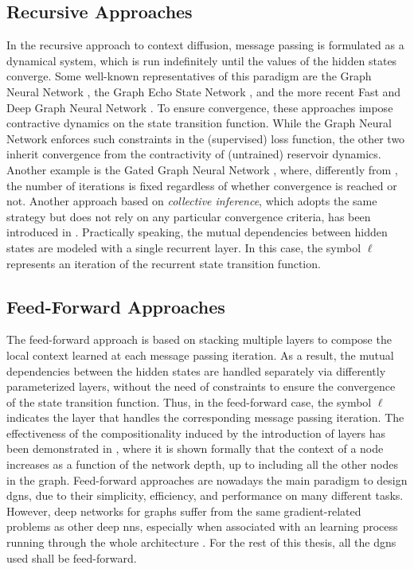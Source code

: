 \subsection{Recursive Approaches}
In the recursive approach to context diffusion, message passing is formulated as a dynamical system, which is run indefinitely until the values of the hidden states converge. Some well-known representatives of this paradigm are the Graph Neural Network \cite{?}, the Graph Echo State Network \cite{?}, and the more recent Fast and Deep Graph Neural Network \citep{?}. To ensure convergence, these approaches impose contractive dynamics on the state transition function. While the Graph Neural Network enforces such constraints in the (supervised) loss function, the other two inherit convergence from the contractivity of (untrained) reservoir dynamics. Another example is the Gated Graph Neural Network \cite{?}, where, differently from \cite{?}, the number of iterations is fixed \apriori regardless of whether convergence is reached or not. Another approach based on \emph{collective inference}, which adopts the same strategy but does not rely on any particular convergence criteria, has been introduced in \cite{?}. Practically speaking, the mutual dependencies between hidden states are modeled with a single recurrent layer. In this case, the symbol $\ell$ represents an iteration of the recurrent state transition function.

\subsection{Feed-Forward Approaches}
The feed-forward approach is based on stacking multiple layers to compose the local context learned at each message passing iteration. As a result, the mutual dependencies between the hidden states are handled separately via differently parameterized layers, without the need of constraints to ensure the convergence of the state transition function. Thus, in the feed-forward case, the symbol $\ell$ indicates the layer that handles the corresponding message passing iteration. The effectiveness of the compositionality induced by the introduction of layers has been demonstrated in \cite{?}, where it is shown formally that the context of a node increases as a function of the network depth, up to including all the other nodes in the graph. Feed-forward approaches are nowadays the main paradigm to design \glspl{dgn}, due to their simplicity, efficiency, and performance on many different tasks. However, deep networks for graphs suffer from the same gradient-related problems as other deep \glspl{nn}, especially when associated with an  learning process running through the whole architecture \citep{?}. For the rest of this thesis, all the \glspl{dgn} used shall be feed-forward.


